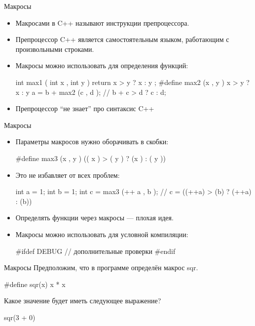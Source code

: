 \documentclass[9pt]{beamer}
\begin{document}
\begin{frame}[fragile]{Макросы}
    \begin{itemize}
        \item Макросами в C++ называют инструкции препроцессора.
        \item Препроцессор C++ является самостоятельным языком,
        работающим с произвольными строками.

        \item Макросы можно использовать для определения функций:
        \begin{cppcode}
            int max1 ( int x , int y ) {
                return x > y ? x : y ;
            }
            #define max2 (x , y ) x > y ? x : y
            a = b + max2 (c , d ); // b + c > d ? c : d;
        \end{cppcode}
        \item Препроцессор “не знает” про синтаксис C++
    \end{itemize}
\end{frame}

\begin{frame}[fragile]{Макросы}
    \begin{itemize}
        \item Параметры макросов нужно оборачивать в скобки:
        \begin{cppcode}
            #define max3 (x , y ) (( x ) > ( y ) ? (x ) : ( y ))
        \end{cppcode}
        \item Это не избавляет от всех проблем:
        \begin{cppcode}
            int a = 1;
            int b = 1;
            int c = max3 (++ a , b );
            // c = ((++a) > (b) ? (++a) : (b))
        \end{cppcode}
        \item Определять функции через макросы — плохая идея.
        \item Макросы можно использовать для условной компиляции:
        \begin{cppcode}
            #ifdef DEBUG
            // дополнительные проверки
            #endif

        \end{cppcode}
    \end{itemize}
\end{frame}

\begin{frame}[fragile]{Макросы}
    Предположим, что в программе определён макрос sqr.
    \begin{cppcode}
        #define sqr(x) x * x
    \end{cppcode}
    
    Какое значение будет иметь следующее выражение?
    \begin{cppcode}
        sqr(3 + 0)
    \end{cppcode}
\end{frame}
\end{document}
